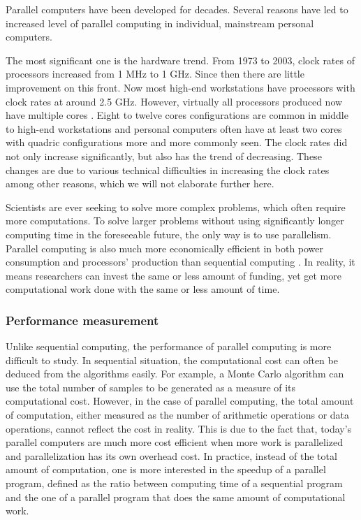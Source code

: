 Parallel computers have been developed for decades. Several reasons have led to increased level of parallel computing in individual, mainstream personal computers.

The most significant one is the hardware trend. From 1973 to 2003, clock rates of processors increased from 1 MHz to 1 GHz. Since then there are little improvement on this front. Now most high-end workstations have processors with clock rates at around 2.5 GHz. However, virtually all processors produced now have multiple cores \cite{parallel}. Eight to twelve cores configurations are common in middle to high-end workstations and personal computers often have at least two cores with quadric configurations more and more commonly seen. The clock rates did not only increase significantly, but also has the trend of decreasing. These changes are due to various technical difficulties in increasing the clock rates among other reasons, which we will not elaborate further here.

Scientists are ever seeking to solve more complex problems, which often require more computations. To solve larger problems without using significantly longer computing time in the foreseeable future, the only way is to use parallelism. Parallel computing is also much more economically efficient in both power consumption and processors' production than sequential computing \cite{parallel}. In reality, it means researchers can invest the same or less amount of funding, yet get more computational work done with the same or less amount of time.

\subsubsection{Performance measurement}
\label{ssub:Performance measurement}

Unlike sequential computing, the performance of parallel computing is more difficult to study. In sequential situation, the computational cost can often be deduced from the algorithms easily. For example, a Monte Carlo algorithm can use the total number of samples to be generated as a measure of its computational cost. However, in the case of parallel computing, the total amount of computation, either measured as the number of arithmetic operations or data operations, cannot reflect the cost in reality. This is due to the fact that, today's parallel computers are much more cost efficient when more work is parallelized \cite{parallel} and parallelization has its own overhead cost. In practice, instead of the total amount of computation, one is more interested in the speedup of a parallel program, defined as the ratio between computing time of a sequential program and the one of a parallel program that does the same amount of computational work.

